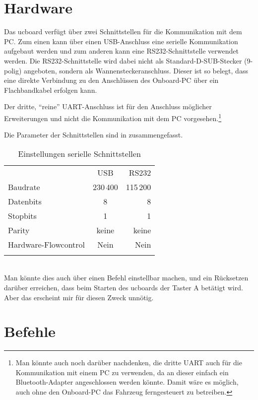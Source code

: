 \section{Hardware}

Das ucboard verfügt über zwei Schnittstellen für die Kommunikation mit dem PC. Zum einen kann über einen USB-Anschluss eine serielle Kommunikation aufgebaut werden und zum anderen kann eine RS232-Schnittstelle verwendet werden. Die RS232-Schnittstelle wird dabei nicht als Standard-D-SUB-Stecker (9-polig) angeboten, sondern als Wannensteckeranschluss. Dieser ist so belegt, dass eine direkte Verbindung zu den Anschlüssen des Onboard-PC über ein Flachbandkabel erfolgen kann.

Der dritte, "`reine"' UART-Anschluss ist für den Anschluss möglicher Erweiterungen und nicht die Kommunikation mit dem PC vorgesehen.\footnote{Man könnte auch noch darüber nachdenken, die dritte UART auch für die Kommunikation mit einem PC zu verwenden, da an dieser einfach ein Bluetooth-Adapter angeschlossen werden könnte. Damit wäre es möglich, auch ohne den Onboard-PC das Fahrzeug ferngesteuert zu betreiben.}


Die Parameter der Schnittstellen sind in  zusammengefasst.

\begin{table}%
	\centering
	\caption{Einstellungen serielle Schnittstellen}
	\label{tab:Comm:UARTParam}
	\begin{tabular}{lcr}
			\mytoprule
			 & USB & RS232 \\
			\mymidrule
			Baudrate & 230\,400 & 115\,200 \\
			Datenbits & 8 & 8 \\
			Stopbits & 1 & 1 \\
			Parity & keine & keine \\
			Hardware-Flowcontrol & Nein & Nein \\
			\mybottomrule
	\end{tabular}\\
	\color[rgb]{1,0,0}{ToDo: Testen, welche Baudrate jeweils maximal möglich ist!} \textcolor[rgb]{0.75,0.75,0.75}{\footnotesize{Man könnte dies auch über einen Befehl einstellbar machen, und ein Rücksetzen darüber erreichen, dass beim Starten des ucboards \zB der Taster A betätigt wird. Aber das erscheint mir für diesen Zweck unnötig.}}
\end{table}


\section{Befehle}

